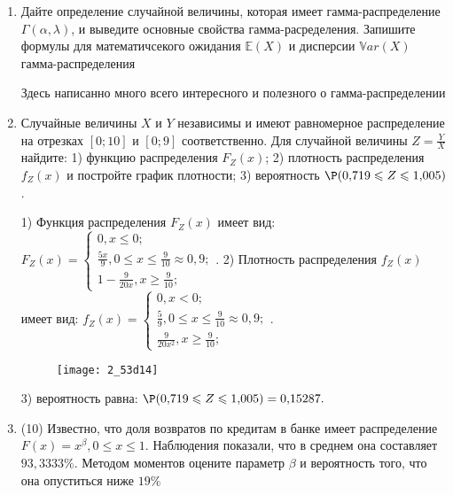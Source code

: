 \documentclass[a4paper,12pt]{article}
\begin{document}
\begin{enumerate}


\item

Дайте определение случайной величины, которая имеет гамма-распределение $\Gamma(\alpha,  \lambda)$, и выведите основные свойства гамма-расределения. Запишите формулы для математичсекого ожидания
$\mathbb{E}(X)$ и дисперсии $\mathbb{V}ar(X)$ гамма-распределения




Здесь написанно много всего интересного и полезного о гамма-распределении


\item



Случайные величины $X$ и $Y$ независимы и имеют равномерное
распределение на отрезках $[0;10]$ и $[0;9]$ соответственно. Для случайной величины $Z=\frac{Y}{X}$ найдите: 
1) функцию распределения $F_Z(x)$;
2) плотность распределения $f_Z(x)$ и постройте график плотности;
3) вероятность $\P(0,\!719\leqslant Z\leqslant 1,\!005)$.




1) Функция распределения $F_Z(x)$ имеет вид:
$
F_Z(x)=\left\{
\begin{array}{l}
0, x\leqslant 0;\\
\frac{5 x}{9}, 0\leqslant x\leqslant \frac{9}{10}\approx 0,\!9;\\
1 - \frac{9}{20 x}, x\geqslant\frac{9}{10};
\end{array}.
\right.
$
2) Плотность распределения $f_Z(x)$ имеет вид:
$
f_Z(x)=\left\{
\begin{array}{l}
0, x<0;\\
\frac{5}{9}, 0\leqslant x\leqslant \frac{9}{10}\approx 0,\!9;\\
\frac{9}{20 x^{2}}, x\geqslant\frac{9}{10};
\end{array}.
\right.
$


\begin{figure}[H]
    \texttt{[image: 2\_53d14]}
\end{figure}


3) вероятность равна:
$
\P(0,\!719\leqslant Z\leqslant 1,\!005)=
0,\!15287.
$


\item


(10) Известно, что доля возвратов по кредитам в банке имеет распределение $F(x) = x ^{\beta}, 0 \leqslant x \leqslant 1$.
Наблюдения показали, что в среднем она составляет $93,3333\%$. Методом моментов оцените параметр $\beta$ и
вероятность того, что она опуститься ниже $19\%$





\end{enumerate}
\end{document}
